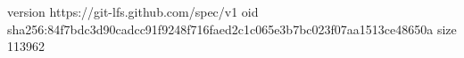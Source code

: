 version https://git-lfs.github.com/spec/v1
oid sha256:84f7bdc3d90cadcc91f9248f716faed2c1c065e3b7bc023f07aa1513ce48650a
size 113962
